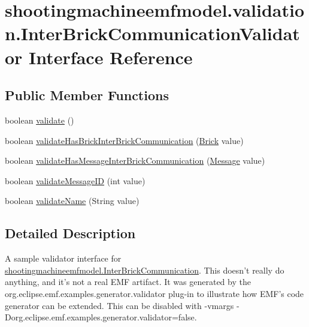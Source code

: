 \hypertarget{interfaceshootingmachineemfmodel_1_1validation_1_1_inter_brick_communication_validator}{\section{shootingmachineemfmodel.\-validation.\-Inter\-Brick\-Communication\-Validator Interface Reference}
\label{interfaceshootingmachineemfmodel_1_1validation_1_1_inter_brick_communication_validator}
}
\subsection*{Public Member Functions}
\begin{DoxyCompactItemize}
\item 
boolean \hyperlink{interfaceshootingmachineemfmodel_1_1validation_1_1_inter_brick_communication_validator_ae62c55c38fcde4ffabb7978ca3503d65}{validate} ()
\item 
boolean \hyperlink{interfaceshootingmachineemfmodel_1_1validation_1_1_inter_brick_communication_validator_a1648b463d54d3276d0e966e401792ab8}{validate\-Has\-Brick\-Inter\-Brick\-Communication} (\hyperlink{interfaceshootingmachineemfmodel_1_1_brick}{Brick} value)
\item 
boolean \hyperlink{interfaceshootingmachineemfmodel_1_1validation_1_1_inter_brick_communication_validator_a2e6cd0246177cfabafc522207e7839f9}{validate\-Has\-Message\-Inter\-Brick\-Communication} (\hyperlink{interfaceshootingmachineemfmodel_1_1_message}{Message} value)
\item 
boolean \hyperlink{interfaceshootingmachineemfmodel_1_1validation_1_1_inter_brick_communication_validator_aff9e86168c1c85a74b9238872ba5b15a}{validate\-Message\-I\-D} (int value)
\item 
boolean \hyperlink{interfaceshootingmachineemfmodel_1_1validation_1_1_inter_brick_communication_validator_a385b6de54961237575c0139ca2a33e1c}{validate\-Name} (String value)
\end{DoxyCompactItemize}


\subsection{Detailed Description}
A sample validator interface for \hyperlink{interfaceshootingmachineemfmodel_1_1_inter_brick_communication}{shootingmachineemfmodel.\-Inter\-Brick\-Communication}. This doesn't really do anything, and it's not a real E\-M\-F artifact. It was generated by the org.\-eclipse.\-emf.\-examples.\-generator.\-validator plug-\/in to illustrate how E\-M\-F's code generator can be extended. This can be disabled with -\/vmargs -\/\-Dorg.\-eclipse.\-emf.\-examples.\-generator.\-validator=false. 

